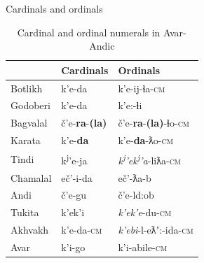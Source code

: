 \begin{frame}{Cardinals and ordinals}

\begin{table}[]
\caption{Cardinal and ordinal numerals in Avar-Andic}
\label{tab:cardord}
\begin{tabular}{l|ll}
                                                             & Cardinals   & Ordinals            \\ \hline
Botlikh                                                      & k'e-da      & k'e-ij-ɬa-\textsc{cm}        \\
Godoberi                                                     & k'e-da      & k'e:-ɬi             \\
Bagvalal                                                     & č’e-\textbf{ra}-\textbf{(la)} & č’e-\textbf{ra}-\textbf{(la)}-ɬo-\textsc{cm}   \\
Karata                                                       & k'e-\textbf{da}      & k’e-\textbf{da}-ƛo-\textsc{cm}        \\
Tindi                                                        & k\textsuperscript{j}'e-ja     & \textit{k\textsuperscript{j}'ek\textsuperscript{j}'a}-liƛa-\textsc{cm}    \\
Chamalal                                                     & eč’-i-da    & eč’-ƛa-b            \\
Andi                                                         & č’e-gu      & č’e-ld:ob         \\
Tukita   & k'ek'i      & \textit{k’ek’e}-du-\textsc{cm}         \\
Akhvakh & k'e-da-\textsc{cm}   & \textit{k’ebi}-l-eƛʼ:-ida-\textsc{cm} \\
Avar                                                         & k'i-go      & k'i-abile-\textsc{cm}       
\end{tabular}
\end{table}
    
\end{frame}

